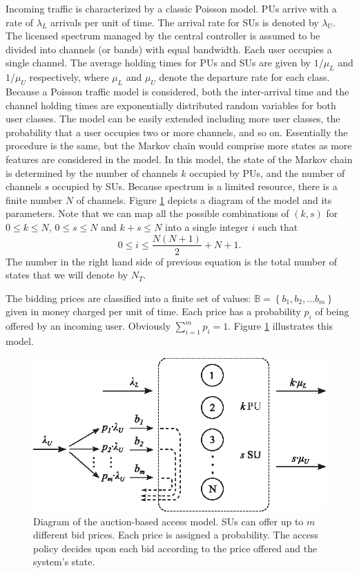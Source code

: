 Incoming traffic is characterized by a classic Poisson model. PUs arrive with a rate of $\lambda_{L}$ arrivals per unit of time. The arrival rate for SUs is denoted by $\lambda_{U}$. The licensed spectrum managed by the central controller is assumed to be divided into channels (or bands) with equal bandwidth. Each user occupies a single channel. The average holding times for PUs and SUs are given by $1/\mu_{L}$ and $1/\mu_{U}$ respectively, where $\mu_{L}$ and $\mu_{U}$ denote the departure rate for each class. Because a Poisson traffic model is considered, both the inter-arrival time and the channel holding times are exponentially distributed random variables for both user classes. The model can be easily extended including more user classes, the probability that a user occupies two or more channels, and so on. Essentially the procedure is the same, but the Markov chain would comprise more states as more features are considered in the model. In this model, the state of the Markov chain is determined by the number of channels $k$ occupied by PUs, and the number of channels $s$ occupied by SUs. Because spectrum is a limited resource, there is a finite number $N$ of channels. Figure \ref{fig:Diagram2} depicts a diagram of the model and its parameters. Note that we can map all the possible combinations of $\left(k,s\right)$ for $0\leq k \leq N$, $0\leq s \leq N$ and $k+s \leq N$ into a single integer $i$ such that
\begin{equation}\label{states}
	  0 \leq i \leq \displaystyle\frac{N\left(N+1\right)}{2}+N+1.
\end{equation}
The number in the right hand side of previous equation is the total number of states that we will denote by $N_{T}$.

The bidding prices are classified into a finite set of values: $\mathbb{B}=\left\{b_{1},b_{2},\ldots b_{m}\right\}$ given in money charged per unit of time. Each price has a probability $p_{i}$ of being offered by an incoming user. Obviously $\sum^{m}_{i=1}p_{i}=1$. Figure \ref{fig:Diagram2} illustrates this model.

\begin{figure}[!t]
\centering
\includegraphics[scale=0.9]{diagram2.eps}
\caption[]{Diagram of the auction-based access model. SUs can offer up to $m$ different bid prices. Each  price is assigned a probability. The access policy decides upon each bid according to the price offered and the system's state.}
\label{fig:Diagram2}
\end{figure}

